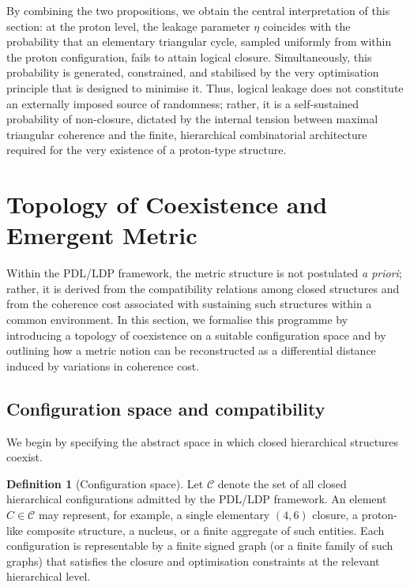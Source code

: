 \documentclass[11pt,a4paper]{article}
\theoremstyle{definition}
\newtheorem{definition}[theorem]{Definition}
\newcommand{\etaL}{\eta} %
\newcommand{\Cconf}{\mathcal{C}} %
\begin{document}
By combining the two propositions, we obtain the central interpretation of this section: at the proton level, the leakage parameter \(\etaL\) coincides with the probability that an elementary triangular cycle, sampled uniformly from within the proton configuration, fails to attain logical closure. Simultaneously, this probability is generated, constrained, and stabilised by the very optimisation principle that is designed to minimise it. Thus, logical leakage does not constitute an externally imposed source of randomness; rather, it is a self-sustained probability of non-closure, dictated by the internal tension between maximal triangular coherence and the finite, hierarchical combinatorial architecture required for the very existence of a proton-type structure.

\section{Topology of Coexistence and Emergent Metric}

Within the PDL/LDP framework, the metric structure is not postulated \textit{a priori}; rather, it is derived from the compatibility relations among closed structures and from the coherence cost associated with sustaining such structures within a common environment. In this section, we formalise this programme by introducing a topology of coexistence on a suitable configuration space and by outlining how a metric notion can be reconstructed as a differential distance induced by variations in coherence cost.

\subsection{Configuration space and compatibility}

We begin by specifying the abstract space in which closed hierarchical structures coexist.

\begin{definition}[Configuration space]
Let \(\Cconf\) denote the set of all closed hierarchical configurations admitted by the PDL/LDP framework. An element \(C \in \Cconf\) may represent, for example, a single elementary \((4,6)\) closure, a proton-like composite structure, a nucleus, or a finite aggregate of such entities. Each configuration is representable by a finite signed graph (or a finite family of such graphs) that satisfies the closure and optimisation constraints at the relevant hierarchical level.
\end{definition}
\end{document}
